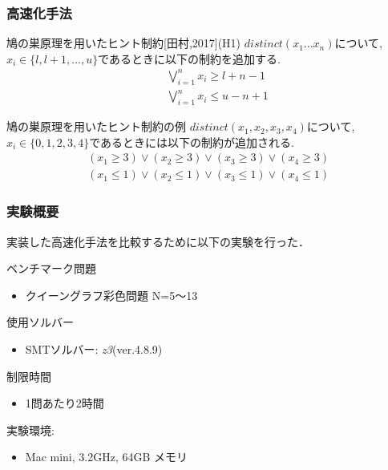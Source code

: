 \documentclass [dvipdfmx,11pt]{beamer}
\begin{document}
\begin{frame}
    \frametitle{高速化手法}
    \vspace{-3mm}
    \begin{block}{鳩の巣原理を用いたヒント制約[田村,2017](H1)}
        $distinct(x_1 ... x_n)$について, $x_i \in \{l, l+1, ..., u\}$であるときに以下の制約を追加する.
        \vspace{-3mm}
        \begin{eqnarray*}
            && \bigvee_{i=1}^n   x_i \geq l+n-1\\
            && \bigvee_{i=1}^n   x_i \leq u-n+1
        \end{eqnarray*}
    \end{block}
    \begin{exampleblock}{鳩の巣原理を用いたヒント制約の例}
        $distinct(x_1, x_2, x_3, x_4)$について, $x_i \in \{0,1,2,3,4\}$であるときには以下の制約が追加される.
        \vspace{-3mm}
        \begin{eqnarray*}
            (x_1 \geq 3) \lor (x_2 \geq 3) \lor (x_3 \geq 3) \lor (x_4 \geq 3)\\
            (x_1 \leq 1) \lor (x_2 \leq 1) \lor (x_3 \leq 1) \lor (x_4 \leq 1)
        \end{eqnarray*}
    \end{exampleblock}
\end{frame}





\begin{frame}
    \frametitle{実験概要}
    実装した高速化手法を比較するために以下の実験を行った．
    \begin{block}{}
    ベンチマーク問題
    \begin{itemize}
        \item クイーングラフ彩色問題 N=5〜13
    \end{itemize}
    使用ソルバー
    \begin{itemize}
        \item SMTソルバー: \textit{z3}(ver.4.8.9)
    \end{itemize}
    制限時間
    \begin{itemize}
        \item 1問あたり2時間
    \end{itemize}
    実験環境:
    \begin{itemize}
        \item Mac mini,  3.2GHz,  64GB メモリ
    \end{itemize}
    \end{block}
\end{frame}
\end{document}
